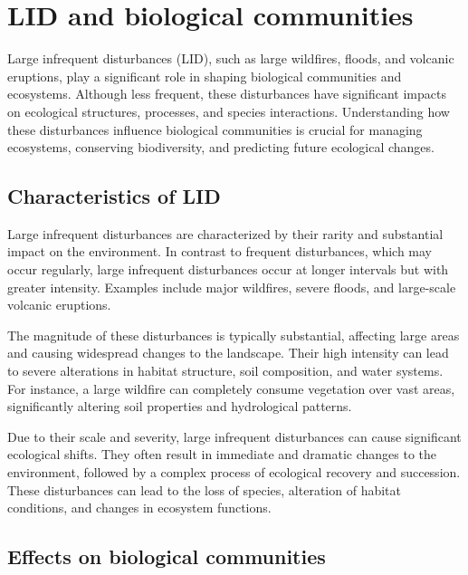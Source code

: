 \documentclass[
  12 pt,
]{Nemilov}
\begin{document}
\section{LID and biological communities}\label{lid-and-biological-communities}

Large infrequent disturbances (LID), such as large wildfires, floods, and volcanic eruptions, play a significant role in shaping biological communities and ecosystems. Although less frequent, these disturbances have significant impacts on ecological structures, processes, and species interactions. Understanding how these disturbances influence biological communities is crucial for managing ecosystems, conserving biodiversity, and predicting future ecological changes.

\subsection{Characteristics of LID}\label{characteristics-of-lid}

Large infrequent disturbances are characterized by their rarity and substantial impact on the environment. In contrast to frequent disturbances, which may occur regularly, large infrequent disturbances occur at longer intervals but with greater intensity. Examples include major wildfires, severe floods, and large-scale volcanic eruptions.

The magnitude of these disturbances is typically substantial, affecting large areas and causing widespread changes to the landscape. Their high intensity can lead to severe alterations in habitat structure, soil composition, and water systems. For instance, a large wildfire can completely consume vegetation over vast areas, significantly altering soil properties and hydrological patterns.

Due to their scale and severity, large infrequent disturbances can cause significant ecological shifts. They often result in immediate and dramatic changes to the environment, followed by a complex process of ecological recovery and succession. These disturbances can lead to the loss of species, alteration of habitat conditions, and changes in ecosystem functions.

\subsection{Effects on biological communities}\label{effects-on-biological-communities}
\end{document}
